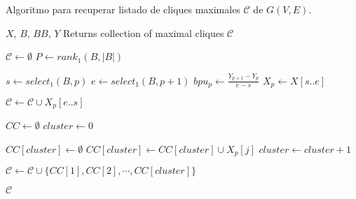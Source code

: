 \begin{algorithm}[H]
\caption{Algoritmo para recuperar listado de cliques maximales $\mathcal{C}$ de $G(V, E)$.}
\label{alg:cliques}
\begin{algorithmic}[1]
    \REQUIRE $X$, $B$, $BB$, $Y$
    \ENSURE Returns collection of maximal cliques $\mathcal{C}$

    \STATE $\mathcal{C} \leftarrow \emptyset$
    \STATE $P \leftarrow rank_{1}(B, |B|)$

        \STATE $s \leftarrow select_{1}(B, p)$
        \STATE $e \leftarrow select_{1}(B, p + 1)$
        \STATE $bpu_{p} \leftarrow \frac{Y_{p + 1} - Y_{p}}{e - s}$
        \STATE $X_{p} \leftarrow X[s..e]$
        
            \STATE $\mathcal{C} \leftarrow \mathcal{C} \cup {X_{p}[e..s]}$
       	\ELSE

		\STATE $CC \leftarrow \emptyset$
            	\STATE $cluster \leftarrow 0$
            	

                		\STATE $CC[cluster] \leftarrow \emptyset$
                        	\STATE $CC[cluster] \leftarrow CC[cluster] \cup X_{p}[j]$
                    	\ENDIF
                    	\STATE $cluster \leftarrow cluster + 1$
                	\ENDFOR
                	
            	\ENDFOR
        	\ENDFOR
        \ENDIF
        
        \STATE $\mathcal{C} \leftarrow \mathcal{C} \cup \{CC[1], CC[2], \cdots, CC[cluster]\}$
    \ENDFOR

    \RETURN $\mathcal{C}$
\end{algorithmic}
\end{algorithm}
